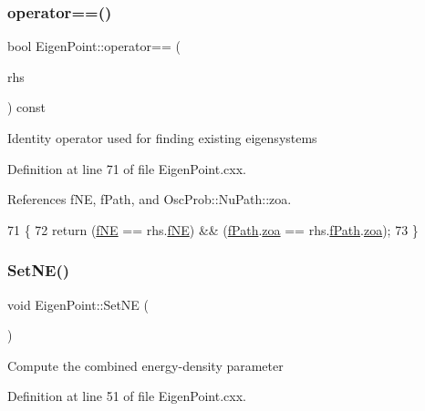 \subsubsection{\texorpdfstring{operator==()}{operator==()}}
{\footnotesize\ttfamily bool Eigen\+Point\+::operator== (\begin{DoxyParamCaption}\item[{const \hyperlink{structOscProb_1_1EigenPoint}{Eigen\+Point} \&}]{rhs }\end{DoxyParamCaption}) const}

Identity operator used for finding existing eigensystems 

Definition at line 71 of file Eigen\+Point.\+cxx.



References f\+NE, f\+Path, and Osc\+Prob\+::\+Nu\+Path\+::zoa.


\begin{DoxyCode}
71                                                          \{
72   \textcolor{keywordflow}{return} (\hyperlink{structOscProb_1_1EigenPoint_af985afcb8012deb6de4fcba66342e0d2}{fNE} == rhs.\hyperlink{structOscProb_1_1EigenPoint_af985afcb8012deb6de4fcba66342e0d2}{fNE}) && (\hyperlink{structOscProb_1_1EigenPoint_a1c263b6ceef5bd4de3181182f944efbb}{fPath}.\hyperlink{structOscProb_1_1NuPath_af3213f3691ba83c6bc05f4a3490f6b31}{zoa} == rhs.\hyperlink{structOscProb_1_1EigenPoint_a1c263b6ceef5bd4de3181182f944efbb}{fPath}.\hyperlink{structOscProb_1_1NuPath_af3213f3691ba83c6bc05f4a3490f6b31}{zoa});
73 \}
\end{DoxyCode}
\mbox{\label{structOscProb_1_1EigenPoint_a30abf0fdf72716458bcf530bd3b806b0}} 
\subsubsection{\texorpdfstring{Set\+N\+E()}{SetNE()}}
{\footnotesize\ttfamily void Eigen\+Point\+::\+Set\+NE (\begin{DoxyParamCaption}{ }\end{DoxyParamCaption})}

Compute the combined energy-\/density parameter 

Definition at line 51 of file Eigen\+Point.\+cxx.




